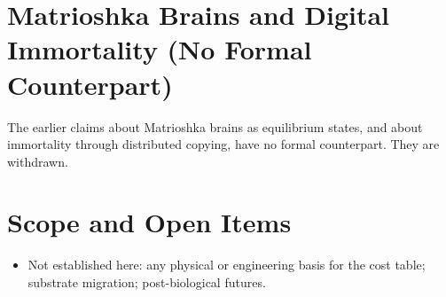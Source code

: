 \documentclass[11pt, a4paper]{article}
\begin{document}
\section{Matrioshka Brains and Digital Immortality (No Formal Counterpart)}
The earlier claims about Matrioshka brains as equilibrium states, and about immortality through distributed copying, have no formal counterpart. They are withdrawn.

\section{Scope and Open Items}
\begin{itemize}
  \item Not established here: any physical or engineering basis for the cost table; substrate migration; post-biological futures.
\end{itemize}
\end{document}
